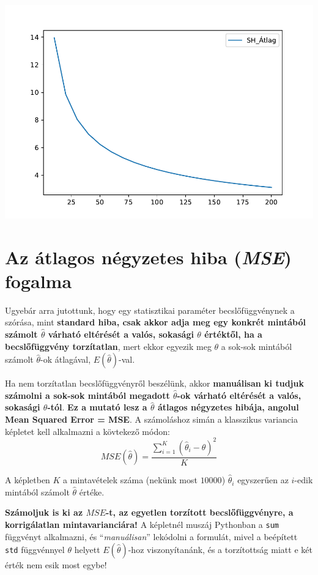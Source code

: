 \documentclass[
]{book}
\begin{document}
\includegraphics{_main_files/figure-latex/unnamed-chunk-247-3.pdf}

\section{\texorpdfstring{Az átlagos négyzetes hiba (\emph{MSE}) fogalma}{Az átlagos négyzetes hiba (MSE) fogalma}}\label{az-uxe1tlagos-nuxe9gyzetes-hiba-mse-fogalma}

Ugyebár arra jutottunk, hogy egy statisztikai paraméter becslőfüggvénynek a szórása, mint \textbf{standard hiba, csak akkor adja meg egy konkrét mintából számolt \(\hat{\theta}\) várható eltérését a valós, sokasági \(\theta\) értéktől, ha a becslőfüggvény torzítatlan}, mert ekkor egyezik meg \(\theta\) a sok-sok mintából számolt \(\hat{\theta}\)-ok átlagával, \(E(\hat{\theta})\)-val.

Ha nem torzítatlan becslőfüggvényről beszélünk, akkor \textbf{manuálisan ki tudjuk számolni a sok-sok mintából megadott \(\hat{\theta}\)-ok várható eltérését a valós, sokasági \(\theta\)-tól}. \textbf{Ez a mutató lesz a \(\hat{\theta}\) átlagos négyzetes hibája, angolul Mean Squared Error = MSE}. A számoláshoz simán a klasszikus variancia képletet kell alkalmazni a kövtekező módon: \[MSE(\hat{\theta})=\frac{\sum_{i=1}^K{(\hat{\theta}_i-\theta)^2}}{K}\]

A képletben \(K\) a mintavételek száma (nekünk most \(10000\)) \(\hat{\theta}_i\) egyszerűen az \(i\)-edik mintából számolt \(\hat{\theta}\) értéke.

\textbf{Számoljuk is ki az \(MSE\)-t, az egyetlen torzított becslőfüggvényre, a korrigálatlan mintavarianciára!} A képletnél muszáj Pythonban a \texttt{sum} függvényt alkalmazni, és ``\emph{manuálisan}'' lekódolni a formulát, mivel a beépített \texttt{std} függvénnyel \(\theta\) helyett \(E(\hat{\theta})\)-hoz viszonyítanánk, és a torzítottság miatt e két érték nem esik most egybe!
\end{document}

